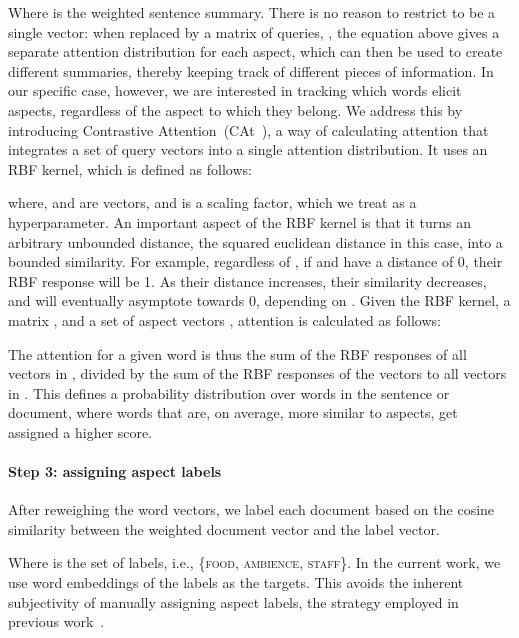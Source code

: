 \documentclass[11pt,a4paper]{article}
\newlength{\catheight}
\newcommand{\ourmodel}{CAt~\raisebox{-0.1ex}{\texttt{[image: fig/cat]}}} \definecolor{aspectcolor}{HTML}{fb7e5e}
\begin{document}
Where  is the weighted sentence summary.
There is no reason to restrict  to be a single vector: when replaced by a matrix of queries, , the equation above gives a separate attention distribution for each aspect, which can then be used to create different summaries, thereby keeping track of different pieces of information.
In our specific case, however, we are interested in tracking which words elicit aspects, regardless of the aspect to which they belong.
We address this by introducing Contrastive Attention~(\ourmodel), a way of calculating attention that integrates a set of query vectors into a single attention distribution.
It uses an RBF kernel, which is defined as follows:



where,  and  are vectors, and  is a scaling factor, which we treat as a hyperparameter.
An important aspect of the RBF kernel is that it turns an arbitrary unbounded distance, the squared euclidean distance in this case, into a bounded similarity. 
For example, regardless of , if  and  have a distance of 0, their RBF response will be 1. 
As their distance increases, their similarity decreases, and will eventually asymptote towards 0, depending on .
Given the RBF kernel, a matrix , and a set of aspect vectors , attention is calculated as follows:



The attention for a given word is thus the sum of the RBF responses of all vectors in , divided by the sum of the RBF responses of the vectors to all vectors in .
This defines a probability distribution over words in the sentence or document, where words that are, on average, more similar to aspects, get assigned a higher score.

\paragraph{Step 3: assigning aspect labels}

After reweighing the word vectors, we label each document based on the cosine similarity between the weighted document vector 
and the label vector.



Where  is the set of labels, i.e., \{\textsc{food}, \textsc{ambience}, \textsc{staff}\}.
In the current work, we use word embeddings of the labels as the targets.
This avoids the inherent subjectivity
of manually assigning aspect labels,
the strategy employed in previous work~\citep{he2017unsupervised,luo2019unsupervised}.
\end{document}
